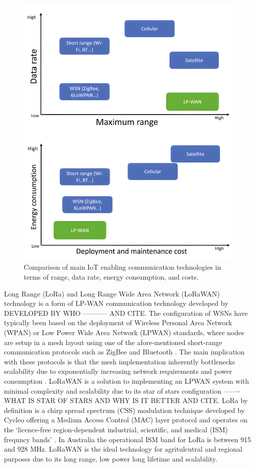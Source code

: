 \begin{figure}[h]
	\centering 
	\caption{Comparison of main IoT enabling communication technologies in terms of range, data rate, energy consumption, and costs. \cite{IOTandLORAWAN-SmartFarm}}
	\label{IOTandLORAWAN-SmartFarm-Figure1}
	\includegraphics[scale=0.1]{Sections/Introduction/LP-WAN-Range.jpg}
\end{figure}

Long Range (LoRa) and Long Range Wide Area Network (LoRaWAN) technology is a form of LP-WAN communication technology developed by DEVELOPED BY WHO ----------- AND CITE. The configuration of WSNs have typically been based on the deployment of Wireless Personal Area Network (WPAN) or Low Power Wide Area Network (LPWAN) standards, 
where nodes are setup in a mesh layout using one of the afore-mentioned short-range communication protocols such as ZigBee and Bluetooth \cite{WSN-WaterQual}. The main implication with these protocols is that the mesh implementation inherently bottlenecks scalability due to exponentially increasing network requirements and power consumption \cite{IOTandLORAWAN-SmartFarm}. LoRaWAN is a solution to implementing an LPWAN system with minimal complexity and scalability due to its star of stars configuration ------- WHAT IS STAR OF STARS AND WHY IS IT BETTER AND CITE. LoRa by definition is a chirp spread spectrum (CSS) modulation technique developed by Cycleo offering a Medium Access Control (MAC) layer protocol and operates on the `licence-free region-dependent industrial, scientific, and medical (ISM) frequncy bands' \cite{IOTandLORAWAN-SmartFarm}. In Australia the operational ISM band for LoRa is between 915 and 928 MHz. LoRaWAN is the ideal technology for agritulcutral and regional purposes due to its long range, low power long lifetime and scalability. 

